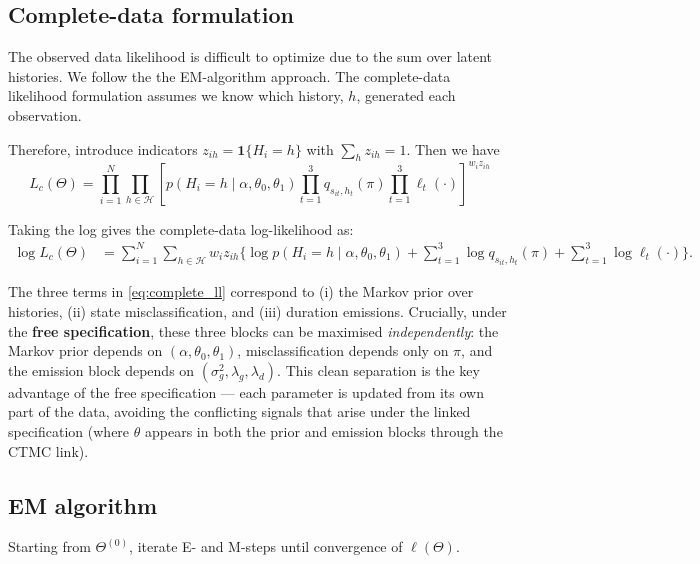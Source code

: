 \documentclass[12pt]{article}
\begin{document}
\subsection{Complete-data formulation}
The observed data likelihood is difficult to optimize due to the sum over latent histories. We follow the the EM-algorithm approach. The complete-data likelihood formulation assumes we know which history, $h$, generated each observation.

Therefore, introduce indicators \(z_{ih}=\mathbf{1}\{H_i=h\}\) with \(\sum_h z_{ih}=1\). Then we have 
\[L_c(\Theta) = \prod_{i=1}^N \prod_{h \in \mathcal{H}} \left[ p(H_i=h\mid\alpha,\theta_0,\theta_1) \prod_{t=1}^3 q_{s_{it},h_t}(\pi) \prod_{t=1}^3 \ell_t(\cdot) \right]^{w_i z_{ih}}\]

Taking the log gives the complete-data log-likelihood as:
\begin{align}
\log L_c(\Theta)
&=\sum_{i=1}^N\sum_{h\in\mathcal{H}} w_i z_{ih}\bigg\{\log p(H_i=h\mid\alpha,\theta_0,\theta_1)
+\sum_{t=1}^3\log q_{s_{it},h_t}(\pi)+\sum_{t=1}^3\log \ell_t(\cdot)\bigg\}.
\label{eq:complete_ll}
\end{align}

The three terms in \eqref{eq:complete_ll} correspond to (i) the Markov prior over histories, (ii) state misclassification, and (iii) duration emissions. Crucially, under the \textbf{free specification}, these three blocks can be maximised \emph{independently}: the Markov prior depends on \((\alpha, \theta_0, \theta_1)\), misclassification depends only on \(\pi\), and the emission block depends on \((\sigma_g^2, \lambda_g, \lambda_d)\). This clean separation is the key advantage of the free specification --- each parameter is updated from its own part of the data, avoiding the conflicting signals that arise under the linked specification (where \(\theta\) appears in both the prior and emission blocks through the CTMC link).

\subsection{EM algorithm}
Starting from \(\Theta^{(0)}\), iterate E- and M-steps until convergence of \(\ell(\Theta)\).
\end{document}

